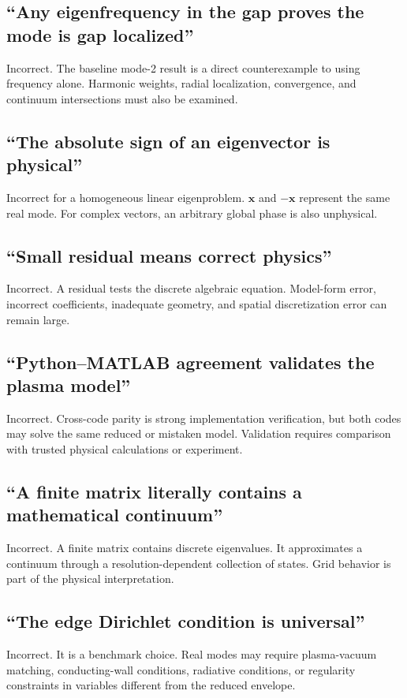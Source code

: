 \subsection{``Any eigenfrequency in the gap proves the mode is gap localized''}
Incorrect. The baseline mode-2 result is a direct counterexample to using frequency alone. Harmonic weights, radial localization, convergence, and continuum intersections must also be examined.

\subsection{``The absolute sign of an eigenvector is physical''}
Incorrect for a homogeneous linear eigenproblem. $\mathbf x$ and $-\mathbf x$ represent the same real mode. For complex vectors, an arbitrary global phase is also unphysical.

\subsection{``Small residual means correct physics''}
Incorrect. A residual tests the discrete algebraic equation. Model-form error, incorrect coefficients, inadequate geometry, and spatial discretization error can remain large.

\subsection{``Python--MATLAB agreement validates the plasma model''}
Incorrect. Cross-code parity is strong implementation verification, but both codes may solve the same reduced or mistaken model. Validation requires comparison with trusted physical calculations or experiment.

\subsection{``A finite matrix literally contains a mathematical continuum''}
Incorrect. A finite matrix contains discrete eigenvalues. It approximates a continuum through a resolution-dependent collection of states. Grid behavior is part of the physical interpretation.

\subsection{``The edge Dirichlet condition is universal''}
Incorrect. It is a benchmark choice. Real modes may require plasma-vacuum matching, conducting-wall conditions, radiative conditions, or regularity constraints in variables different from the reduced envelope.

